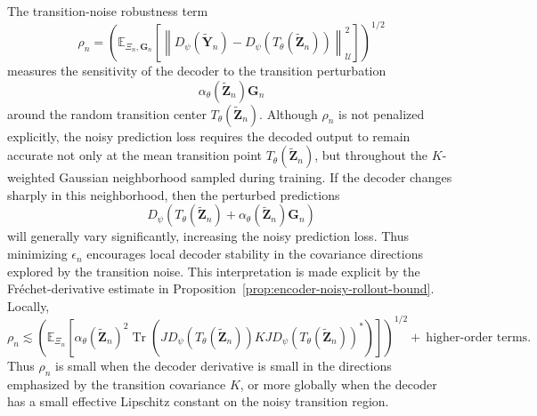 \documentclass[11pt]{article}
\begin{document}
\begin{remark}
The transition-noise robustness term
\[
    \rho_n
    =
    \left(
    \mathbb E_{\Xi_n,\mathbf G_n}
    \left[
    \left\|
    D_\psi(\widetilde{\mathbf Y}_n)
    -
    D_\psi(T_\theta(\widetilde{\mathbf Z}_n))
    \right\|_{\mathcal U}^2
    \right]
    \right)^{1/2}
\]
measures the sensitivity of the decoder to the transition perturbation
\[
    \alpha_\theta(\widetilde{\mathbf Z}_n)\mathbf G_n
\]
around the random transition center $T_\theta(\widetilde{\mathbf Z}_n)$. Although $\rho_n$ is not penalized explicitly, the noisy prediction loss requires the decoded output to remain accurate not only at the mean transition point $T_\theta(\widetilde{\mathbf Z}_n)$, but throughout the $K$-weighted Gaussian neighborhood sampled during training. If the decoder changes sharply in this neighborhood, then the perturbed predictions
\[
    D_\psi\!\left(
    T_\theta(\widetilde{\mathbf Z}_n)
    +
    \alpha_\theta(\widetilde{\mathbf Z}_n)\mathbf G_n
    \right)
\]
will generally vary significantly, increasing the noisy prediction loss. Thus minimizing $\epsilon_n$ encourages local decoder stability in the covariance directions explored by the transition noise. This interpretation is made explicit by the Fr\'echet-derivative estimate in Proposition~\ref{prop:encoder-noisy-rollout-bound}. Locally,
\[
    \rho_n
    \lesssim
    \left(
    \mathbb E_{\Xi_n}
    \left[
    \alpha_\theta(\widetilde{\mathbf Z}_n)^2
    \operatorname{Tr}
    \left(
    JD_\psi(T_\theta(\widetilde{\mathbf Z}_n))
    K
    JD_\psi(T_\theta(\widetilde{\mathbf Z}_n))^\ast
    \right)
    \right]
    \right)^{1/2}
    +\ 
    \text{higher-order terms}.
\]
Thus $\rho_n$ is small when the decoder derivative is small in the directions emphasized by the transition covariance $K$, or more globally when the decoder has a small effective Lipschitz constant on the noisy transition region.


\end{remark}
\end{document}
